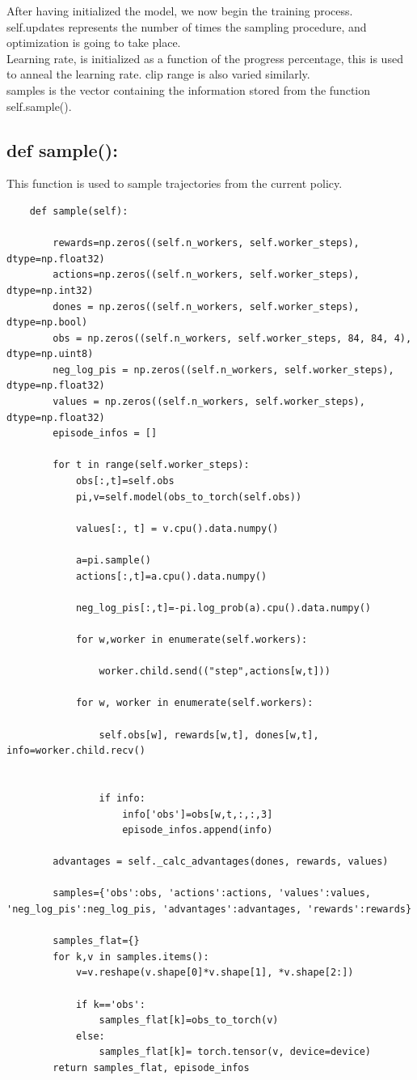 \documentclass[12pt]{extarticle}
\begin{document}
After having initialized the model, we now begin the training process. \\
self.updates represents the number of times the sampling procedure, and optimization is going to take place. \\
Learning rate, is initialized as a function of the progress percentage, this is used to anneal the learning rate. clip range is also varied similarly. \\
\newline
samples is the vector containing the information stored from the function self.sample(). 
\subsection{def sample():}

This function is used to sample trajectories from the current policy.
\begin{lstlisting}
	def sample(self):
		
		rewards=np.zeros((self.n_workers, self.worker_steps), dtype=np.float32)
		actions=np.zeros((self.n_workers, self.worker_steps), dtype=np.int32)
		dones = np.zeros((self.n_workers, self.worker_steps), dtype=np.bool)
		obs = np.zeros((self.n_workers, self.worker_steps, 84, 84, 4), dtype=np.uint8)
		neg_log_pis = np.zeros((self.n_workers, self.worker_steps), dtype=np.float32)
		values = np.zeros((self.n_workers, self.worker_steps), dtype=np.float32)
		episode_infos = []

		for t in range(self.worker_steps):
			obs[:,t]=self.obs
			pi,v=self.model(obs_to_torch(self.obs))

			values[:, t] = v.cpu().data.numpy()
			
			a=pi.sample()
			actions[:,t]=a.cpu().data.numpy()
			
			neg_log_pis[:,t]=-pi.log_prob(a).cpu().data.numpy()

			for w,worker in enumerate(self.workers):

				worker.child.send(("step",actions[w,t]))

			for w, worker in enumerate(self.workers):
				
				self.obs[w], rewards[w,t], dones[w,t], info=worker.child.recv()


				if info:
					info['obs']=obs[w,t,:,:,3]
					episode_infos.append(info)

		advantages = self._calc_advantages(dones, rewards, values)

		samples={'obs':obs, 'actions':actions, 'values':values, 'neg_log_pis':neg_log_pis, 'advantages':advantages, 'rewards':rewards}

		samples_flat={}
		for k,v in samples.items():
			v=v.reshape(v.shape[0]*v.shape[1], *v.shape[2:])

			if k=='obs':
				samples_flat[k]=obs_to_torch(v)
			else:
				samples_flat[k]= torch.tensor(v, device=device)
		return samples_flat, episode_infos
\end{lstlisting}
\end{document}
